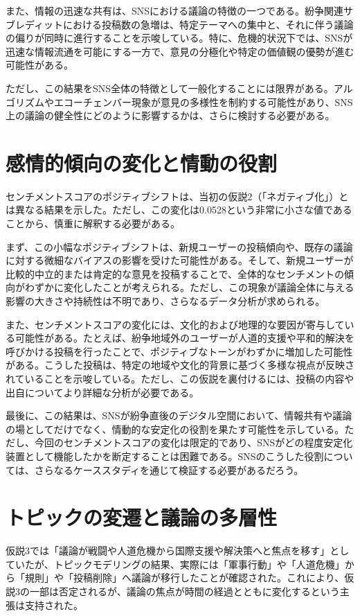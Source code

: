 \documentclass[11pt, a4j]{jreport}
\begin{document}
    また、情報の迅速な共有は、SNSにおける議論の特徴の一つである。紛争関連サブレディットにおける投稿数の急増は、特定テーマへの集中と、それに伴う議論の偏りが同時に進行することを示唆している。特に、危機的状況下では、SNSが迅速な情報流通を可能にする一方で、意見の分極化や特定の価値観の優勢が進む可能性がある。
    
    ただし、この結果をSNS全体の特徴として一般化することには限界がある。アルゴリズムやエコーチェンバー現象\citep{pariser2011filter}が意見の多様性を制約する可能性があり、SNS上の議論の健全性にどのように影響するかは、さらに検討する必要がある。

    \section{感情的傾向の変化と情動の役割}
    センチメントスコアのポジティブシフトは、当初の仮説2（「ネガティブ化」）とは異なる結果を示した。ただし、この変化は0.0528という非常に小さな値であることから、慎重に解釈する必要がある。
    
    まず、この小幅なポジティブシフトは、新規ユーザーの投稿傾向や、既存の議論に対する微細なバイアスの影響を受けた可能性がある。そして、新規ユーザーが比較的中立的または肯定的な意見を投稿することで、全体的なセンチメントの傾向がわずかに変化したことが考えられる。ただし、この現象が議論全体に与える影響の大きさや持続性は不明であり、さらなるデータ分析が求められる。
    
    また、センチメントスコアの変化には、文化的および地理的な要因が寄与している可能性がある。たとえば、紛争地域外のユーザーが人道的支援や平和的解決を呼びかける投稿を行ったことで、ポジティブなトーンがわずかに増加した可能性がある。こうした投稿は、特定の地域や文化的背景に基づく多様な視点が反映されていることを示唆している。ただし、この仮説を裏付けるには、投稿の内容や出自についてより詳細な分析が必要である。
    
    最後に、この結果は、SNSが紛争直後のデジタル空間において、情報共有や議論の場としてだけでなく、情動的な安定化の役割を果たす可能性を示している。ただし、今回のセンチメントスコアの変化は限定的であり、SNSがどの程度安定化装置として機能したかを断定することは困難である。SNSのこうした役割については、さらなるケーススタディを通じて検証する必要があるだろう。

    \section{トピックの変遷と議論の多層性}
    仮説3では「議論が戦闘や人道危機から国際支援や解決策へと焦点を移す」としていたが、トピックモデリングの結果、実際には「軍事行動」や「人道危機」から「規則」や「投稿削除」へ議論が移行したことが確認された。これにより、仮説3の一部は否定されるが、議論の焦点が時間の経過とともに変化するという主張は支持された。
    
\end{document}
